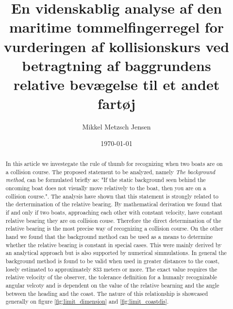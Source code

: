 \documentclass[%
 reprint,
nofootinbib,
aps,
]{revtex4-1}
\begin{document}
\title{En videnskablig analyse af den maritime tommelfingerregel for vurderingen af kollisionskurs ved betragtning af baggrundens relative bevægelse til et andet fartøj}
\author{Mikkel Metzsch Jensen}

\date{\today}


\begin{abstract}
  In this article we investegate the rule of thumb for recognizing when two boats are on a collision course. The proposed statement to be analyzed, namely \textit{The background method}, can be formulated briefly as: "If the static background seen behind the oncoming boat does not visually move relatively to the boat, then you are on a collision course.". The analysis have shown that this statement is strongly related to the dertermination of the relative bearing. By mathematical derivation we found that if and only if two boats, approaching each other with constant velocity, have constant relative bearing they are on collision couse. Therefore the direct determination of the relative bearing is the most precise way of recognizing a collision course. On the other hand we found that the background method can be used as a means to determine whether the relative bearing is constant in special cases. This were mainly derived by an analytical approach but is also supported by numerical simmulations. In general the background method is found to be valid when used in greater distances to the coast, losely estimated to approximately 833 meters or more. The exact value requires the relative velocity of the observer, the tolerance definition for a humanly recognizable angular velcoty and is dependent on the value of the relative bearning and the angle between the heading and the coast. The nature of this relationship is showcased generally on figure \ref{fig:limit_dimension} and \ref{fig:limit_coastdis}.
\end{abstract}


\maketitle
\end{document}
